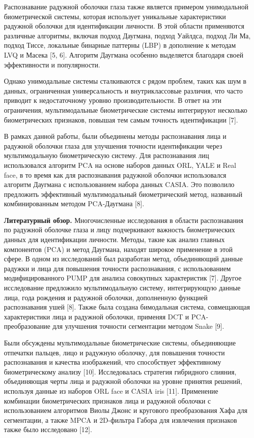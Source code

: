 Распознавание радужной оболочки глаза также является примером
унимодальной биометрической системы, которая использует уникальные
характеристики радужной оболочки для идентификации личности. В этой
области применяются различные алгоритмы, включая подход Даугмана, подход
Уайлдса, подход Ли Ма, подход Тиссе, локальные бинарные паттерны (LBP) в
дополнение к методам LVQ и Масека {[}5, 6{]}. Алгоритм Даугмана особенно
выделяется благодаря своей эффективности и популярности.

Однако унимодальные системы сталкиваются с рядом проблем, таких как шум
в данных, ограниченная универсальность и внутриклассовые различия, что
часто приводит к недостаточному уровню производительности. В ответ на
эти ограничения, мультимодальные биометрические системы интегрируют
несколько биометрических признаков, повышая тем самым точность
идентификации {[}7{]}.

В рамках данной работы, были объединены методы распознавания лица и
радужной оболочки глаза для улучшения точности идентификации через
мультимодальную биометрическую систему. Для распознавания лиц
использовался алгоритм PCA на основе наборов данных ORL, YALE и Real
face, в то время как для распознавания радужной оболочки использовался
алгоритм Даугмана с использованием набора данных CASIA. Это позволило
предложить эффективный мультимодальный биометрический метод, названный
комбинированным методом PCA-Даугмана {[}8{]}.

\textbf{Литературный обзор.} Многочисленные исследования в области
распознавания по радужной оболочке глаза и лицу подчеркивают важность
биометрических данных для идентификации личности. Методы, такие как
анализ главных компонентов (PCA) и метод Даугмана, находят широкое
применение в этой сфере. В одном из исследований был разработан метод,
объединяющий данные радужки и лица для повышения точности распознавания,
с использованием модифицированного PUMP для анализа совокупных
характеристик {[}7{]}. Другое исследование предложило мультимодальную
систему, интегрирующую данные лица, года рождения и радужной оболочки,
дополненную функцией распознавания ушей {[}8{]}. Также была создана
бимодальная система, совмещающая характеристики лица и радужной
оболочки, применяя DCT и PCA-преобразование для улучшения точности
сегментации методом Snake {[}9{]}.

Были обсуждены мультимодальные биометрические системы, объединяющие
отпечатки пальцев, лицо и радужную оболочку, для повышения точности
распознавания и качества изображений, что способствует эффективному
биометрическому анализу {[}10{]}. Исследовалась стратегия гибридного
слияния, объединяющая черты лица и радужной оболочки на уровне принятия
решений, используя данные из наборов ORL face и CASIA iris {[}11{]}.
Применение комбинации биометрических признаков лица и радужной оболочки
с использованием алгоритмов Виолы Джонс и кругового преобразования Хафа
для сегментации, а также MPCA и 2D-фильтра Габора для извлечения
признаков также было исследовано {[}12{]}.

